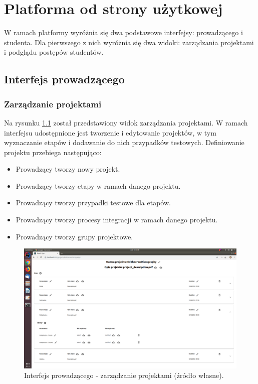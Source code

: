 \chapter{Platforma od strony użytkowej}
\label{chapter:interfaces}

W ramach platformy wyróżnia się dwa podstawowe interfejsy: prowadzącego i studenta.
Dla pierwszego z nich wyróżnia się dwa widoki: zarządzania projektami i podglądu postępów studentów.

\section{Interfejs prowadzącego}

\subsection{Zarządzanie projektami}

Na rysunku \ref{fig:lecturer-interface-management} został przedstawiony widok zarządzania projektami.
W ramach interfejsu udostępnione jest tworzenie i edytowanie projektów, w tym wyznaczanie etapów i dodawanie do nich przypadków testowych.
Definiowanie projektu przebiega następująco:
\begin {itemize}
    \item Prowadzący tworzy nowy projekt.
    \item Prowadzący tworzy etapy w ramach danego projektu.
    \item Prowadzący tworzy przypadki testowe dla etapów.
    \item Prowadzący tworzy procesy integracji w ramach danego projektu.
    \item Prowadzący tworzy grupy projektowe.
\end {itemize}

\begin{figure}[h]
    \centering
    \includegraphics[width = 13cm]{chapter03/lecturer_interface_management.png}
    \caption{Interfejs prowadzącego - zarządzanie projektami (źródło własne).}
    \label{fig:lecturer-interface-management}
\end{figure}

